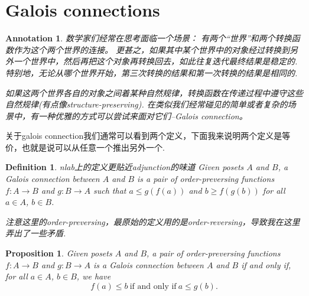 \documentclass{article}
\newtheorem{proposition}[theorem]{Proposition}
\newtheorem{definition}[theorem]{Definition}
\newtheorem{annotation}[theorem]{Annotation}
\newcommand*{\xfunc}[4]{{#2}\colon{#3}{#1}{#4}}
\newcommand*{\func}[3]{\xfunc{\to}{#1}{#2}{#3}}
\begin{document}
\newpage
\section{Galois connections}

\begin{annotation}
\rm 数学家们经常在思考面临一个场景： 有两个“世界”和两个转换函数作为这个两个世界的连接。 更甚之，如果其中某个世界中的对象经过转换到另外一个世界中，然后再把这个对象再转换回去，如此往复迭代最终结果是稳定的. 特别地，无论从哪个世界开始，第三次转换的结果和第一次转换的结果是相同的. 

如果这两个世界各自的对象之间着某种自然规律，转换函数在传递过程中遵守这些自然规律(有点像structure-preserving). 在类似我们经常碰见的简单或者复杂的场景中，有一种优雅的方式可以尝试来面对它们--Galois connection。
\end{annotation}

关于galois connection我们通常可以看到两个定义，下面我来说明两个定义是等价，也就是说可以从任意一个推出另外一个.

\begin{definition}
\rm {\color{red} nlab上的定义更贴近adjunction的味道} Given posets $A$ and $B$, a Galois connection between $A$ and $B$ is a pair of order-preversing functions $\func{f}{A}{B}$ and $\func{g}{B}{A}$ such that $a \leq g(f(a))$ and $b \geq f(g(b))$ for all $a \in A$, $b \in B$. 

{\color{blue} 注意这里的order-preversing，最原始的定义用的是order-reversing，导致我在这里弄出了一些矛盾}.
\end{definition}


\begin{proposition}\label{gc-second-def}
\rm Given posets $A$ and $B$, a pair of order-preversing functions $\func{f}{A}{B}$ and $\func{g}{B}{A}$ is a Galois connection between $A$ and $B$ if and only if, for all $a \in A$, $b \in B$, we have 
$$
f(a) \leq b~\text{if and only if}~a \leq g(b).
$$
\end{proposition}
\end{document}
